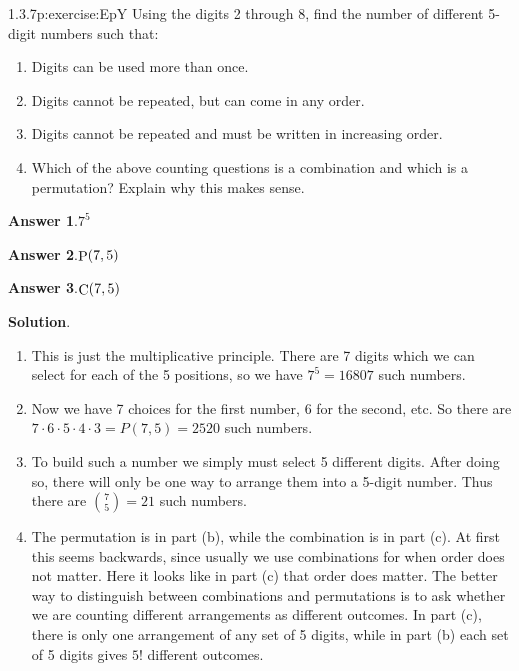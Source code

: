 \documentclass[twoside,11pt,]{book}
\newcommand{\blocktitlefont}{\relax}
\numberwithin{equation}{chapter}
\begin{document}
\begin{divisionsolution}{1.3.7}{}{p:exercise:EpY}%
Using the digits 2 through 8, find the number of different 5-digit numbers such that:%
\begin{enumerate}[label=(\alph*)]
\item{}Digits can be used more than once.%
\item{}Digits cannot be repeated, but can come in any order.%
\item{}Digits cannot be repeated and must be written in increasing order.%
\item{}Which of the above counting questions is a combination and which is a permutation? Explain why this makes sense.%
\end{enumerate}
%
\par\smallskip%
\noindent\textbf{\blocktitlefont Answer 1}.\quad{}\(7^{5}\)%
\par\smallskip%
\noindent\textbf{\blocktitlefont Answer 2}.\quad{}\(\mathop{\rm P}\nolimits\!\left(7,5\right)\)%
\par\smallskip%
\noindent\textbf{\blocktitlefont Answer 3}.\quad{}\(\mathop{\rm C}\nolimits\!\left(7,5\right)\)%
\par\smallskip%
\noindent\textbf{\blocktitlefont Solution}.\quad{}%
\begin{enumerate}[label=(\alph*)]
\item{}This is just the multiplicative principle. There are 7 digits which we can select for each of the 5 positions, so we have \(7^5 = 16807\) such numbers.%
\item{}Now we have 7 choices for the first number, 6 for the second, etc. So there are \(7 \cdot 6 \cdot 5 \cdot 4 \cdot 3 = P(7,5) = 2520\) such numbers.%
\item{}To build such a number we simply must select 5 different digits. After doing so, there will only be one way to arrange them into a 5-digit number. Thus there are \({7 \choose 5} = 21\) such numbers.%
\item{}The permutation is in part (b), while the combination is in part (c). At first this seems backwards, since usually we use combinations for when order does not matter. Here it looks like in part (c) that order does matter. The better way to distinguish between combinations and permutations is to ask whether we are counting different arrangements as different outcomes. In part (c), there is only one arrangement of any set of 5 digits, while in part (b) each set of 5 digits gives \(5!\) different outcomes.%
\end{enumerate}
%
\end{divisionsolution}%
\end{document}

